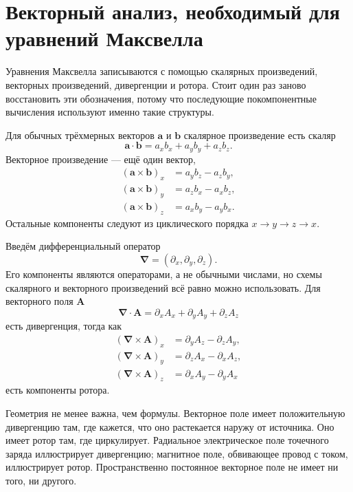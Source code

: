 \section{Векторный анализ, необходимый для уравнений Максвелла}

Уравнения Максвелла записываются с помощью скалярных произведений, векторных произведений, дивергенции и ротора. Стоит один раз заново восстановить эти обозначения, потому что последующие покомпонентные вычисления используют именно такие структуры.

Для обычных трёхмерных векторов \(\mathbf a\) и \(\mathbf b\) скалярное произведение есть скаляр
\begin{equation}
\mathbf a\cdot\mathbf b
=a_xb_x+a_yb_y+a_zb_z.
\end{equation}
Векторное произведение — ещё один вектор,
\begin{align}
(\mathbf a\times\mathbf b)_x&=a_yb_z-a_zb_y,\\
(\mathbf a\times\mathbf b)_y&=a_zb_x-a_xb_z,\\
(\mathbf a\times\mathbf b)_z&=a_xb_y-a_yb_x.
\end{align}
Остальные компоненты следуют из циклического порядка \(x\to y\to z\to x\).

Введём дифференциальный оператор
\begin{equation}
\boldsymbol\nabla=
\left(\partial_x,\partial_y,\partial_z\right).
\end{equation}
Его компоненты являются операторами, а не обычными числами, но схемы скалярного и векторного произведений всё равно можно использовать. Для векторного поля \(\mathbf A\)
\begin{equation}
\boldsymbol\nabla\cdot\mathbf A
=\partial_xA_x+\partial_yA_y+\partial_zA_z
\label{eq:divergence}
\end{equation}
есть дивергенция, тогда как
\begin{align}
(\boldsymbol\nabla\times\mathbf A)_x
 &=\partial_yA_z-\partial_zA_y,\\
(\boldsymbol\nabla\times\mathbf A)_y
 &=\partial_zA_x-\partial_xA_z,\\
(\boldsymbol\nabla\times\mathbf A)_z
 &=\partial_xA_y-\partial_yA_x
\label{eq:curl}
\end{align}
есть компоненты ротора.

Геометрия не менее важна, чем формулы. Векторное поле имеет положительную дивергенцию там, где кажется, что оно растекается наружу от источника. Оно имеет ротор там, где циркулирует. Радиальное электрическое поле точечного заряда иллюстрирует дивергенцию; магнитное поле, обвивающее провод с током, иллюстрирует ротор. Пространственно постоянное векторное поле не имеет ни того, ни другого.

